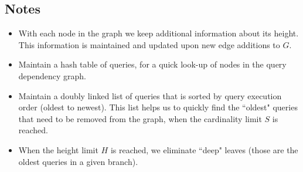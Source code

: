 \subsection{Notes} 
\begin{itemize}
    \item With each node in the graph we keep additional information about its height. This information is maintained and updated upon new edge additions to $G$.
    \item Maintain a hash table of queries, for a quick look-up of nodes in the query dependency graph.
    \item Maintain a doubly linked list of queries that is sorted by query execution order (oldest to newest). This list helps us to quickly find the ``oldest" queries that need to be removed from the graph, when the cardinality limit $S$ is reached.
    \item When the height limit $H$ is reached, we eliminate ``deep" leaves (those are the oldest queries in a given branch).
\end{itemize}


